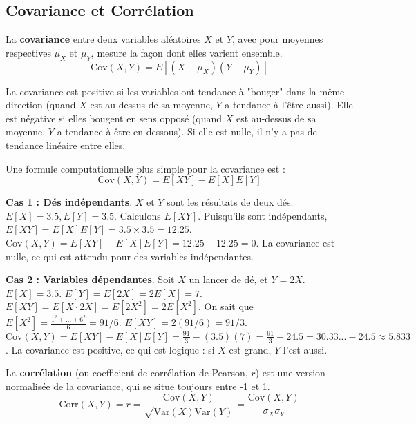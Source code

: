 \subsection{Covariance et Corrélation}

\begin{definitionbox}[Covariance]
La \textbf{covariance} entre deux variables aléatoires $X$ et $Y$, avec pour moyennes respectives $\mu_X$ et $\mu_Y$, mesure la façon dont elles varient ensemble.
$$ \text{Cov}(X,Y) = E[(X - \mu_X)(Y - \mu_Y)] $$
\end{definitionbox}

\begin{intuitionbox}
La covariance est positive si les variables ont tendance à "bouger" dans la même direction (quand $X$ est au-dessus de sa moyenne, $Y$ a tendance à l'être aussi). Elle est négative si elles bougent en sens opposé (quand $X$ est au-dessus de sa moyenne, $Y$ a tendance à être en dessous). Si elle est nulle, il n'y a pas de tendance linéaire entre elles.
\end{intuitionbox}

\begin{theorembox}
Une formule computationnelle plus simple pour la covariance est :
$$ \text{Cov}(X,Y) = E[XY] - E[X]E[Y] $$
\end{theorembox}

\begin{examplebox}
\textbf{Cas 1 : Dés indépendants}. $X$ et $Y$ sont les résultats de deux dés. $E[X]=3.5, E[Y]=3.5$.
Calculons $E[XY]$. Puisqu'ils sont indépendants, $E[XY] = E[X]E[Y] = 3.5 \times 3.5 = 12.25$.
$\text{Cov}(X,Y) = E[XY] - E[X]E[Y] = 12.25 - 12.25 = 0$.
La covariance est nulle, ce qui est attendu pour des variables indépendantes.

\textbf{Cas 2 : Variables dépendantes}. Soit $X$ un lancer de dé, et $Y = 2X$.
$E[X] = 3.5$. $E[Y] = E[2X] = 2E[X] = 7$.
$E[XY] = E[X \cdot 2X] = E[2X^2] = 2 E[X^2]$.
On sait que $E[X^2] = \frac{1^2+...+6^2}{6} = 91/6$.
$E[XY] = 2(91/6) = 91/3$.
$\text{Cov}(X,Y) = E[XY] - E[X]E[Y] = \frac{91}{3} - (3.5)(7) = \frac{91}{3} - 24.5 = 30.33... - 24.5 \approx 5.833$.
La covariance est positive, ce qui est logique : si $X$ est grand, $Y$ l'est aussi.
\end{examplebox}

\begin{definitionbox}[Corrélation]
La \textbf{corrélation} (ou coefficient de corrélation de Pearson, $r$) est une version normalisée de la covariance, qui se situe toujours entre -1 et 1.
$$ \text{Corr}(X,Y) = r = \frac{\text{Cov}(X,Y)}{\sqrt{\text{Var}(X)\text{Var}(Y)}} = \frac{\text{Cov}(X,Y)}{\sigma_X \sigma_Y} $$
\end{definitionbox}

